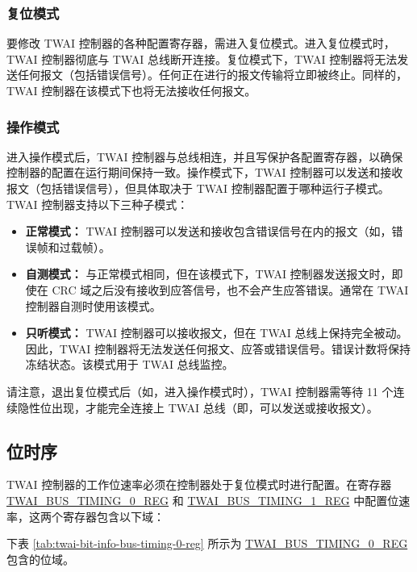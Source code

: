 \documentclass[main\_\_CN.tex]{subfiles}
\begin{document}
\subsubsection{复位模式}
要修改 TWAI 控制器的各种配置寄存器，需进入复位模式。进入复位模式时，TWAI 控制器彻底与 TWAI 总线断开连接。复位模式下，TWAI 控制器将无法发送任何报文（包括错误信号）。任何正在进行的报文传输将立即被终止。同样的，TWAI 控制器在该模式下也将无法接收任何报文。

\subsubsection{操作模式}
进入操作模式后，TWAI 控制器与总线相连，并且写保护各配置寄存器，以确保控制器的配置在运行期间保持一致。操作模式下，TWAI 控制器可以发送和接收报文（包括错误信号），但具体取决于 TWAI 控制器配置于哪种运行子模式。TWAI 控制器支持以下三种子模式：

\begin{itemize}
    \item {\bfseries 正常模式：} TWAI 控制器可以发送和接收包含错误信号在内的报文（如，错误帧和过载帧）。
    \item {\bfseries 自测模式：} 与正常模式相同，但在该模式下，TWAI 控制器发送报文时，即使在 CRC 域之后没有接收到应答信号，也不会产生应答错误。通常在 TWAI 控制器自测时使用该模式。
    \item {\bfseries 只听模式：} TWAI 控制器可以接收报文，但在 TWAI 总线上保持完全被动。因此，TWAI 控制器将无法发送任何报文、应答或错误信号。错误计数将保持冻结状态。该模式用于 TWAI 总线监控。
\end{itemize}

请注意，退出复位模式后（如，进入操作模式时），TWAI 控制器需等待 11 个连续隐性位出现，才能完全连接上 TWAI 总线（即，可以发送或接收报文）。

\subsection{位时序}
TWAI 控制器的工作位速率必须在控制器处于复位模式时进行配置。在寄存器 \\\hyperref[regdesc:TWAIBUSTIMING0REG]{TWAI\_BUS\_TIMING\_0\_REG} 和 \hyperref[regdesc:TWAIBUSTIMING1REG]{TWAI\_BUS\_TIMING\_1\_REG} 中配置位速率，这两个寄存器包含以下域：

下表 \ref{tab:twai-bit-info-bus-timing-0-reg} 所示为 \hyperref[regdesc:TWAIBUSTIMING0REG]{TWAI\_BUS\_TIMING\_0\_REG} 包含的位域。
\end{document}
